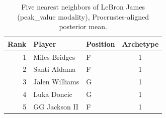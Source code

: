 \begin{table}[htbp]
  \centering\small
  \begin{tabular}{rllc}
    \toprule
    Rank & Player & Position & Archetype \\
    \midrule
    1 & Miles Bridges & F & 1 \\
    2 & Santi Aldama & F & 1 \\
    3 & Jalen Williams & G & 1 \\
    4 & Luka Doncic & G & 1 \\
    5 & GG Jackson II & F & 1 \\
    \bottomrule
  \end{tabular}
  \caption{Five nearest neighbors of LeBron James (peak_value modality), Procrustes-aligned posterior mean.}
  \label{tab:LeBron_James_neighbors_peak_value}
\end{table}

